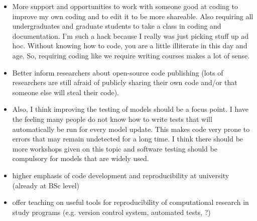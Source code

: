 \documentclass{article}
\begin{document}
\begin{itemize}
	\item More support and opportunities to work with someone good at coding to improve my own coding and to edit it to be more shareable. Also requiring all undergraduates and graduate students to take a class in coding and documentation. I'm such a hack because I really was just picking stuff up ad hoc. Without knowing how to code, you are a little illiterate in this day and age. So, requiring coding like we require writing courses makes a lot of sense.
	\item Better inform researchers about open-source code publishing (lots of researchers are still afraid of publicly sharing their own code and/or that someone else will steal their code).
	\item Also, I think improving the testing of models should be a focus point. I have the feeling many people do not know how to write tests that will automatically be run for every model update. This makes code very prone to errors that may remain undetected for a long time. I think there should be more workshops given on this topic and software testing should be compulsory for models that are widely used.
	\item higher emphasis of code development and reproducibility at university (already at BSc level)
	\item offer teaching on useful tools for reproducibility of computational research in study programs (e.g. version control system, automated tests, ?)
\end{itemize}
\end{document}

